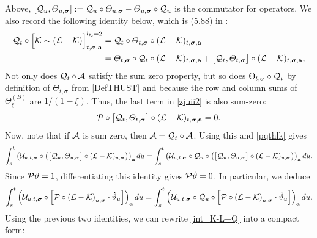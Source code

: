 Above, $[{\cal Q}_{u},\varTheta_{u,\boldsymbol{\sigma}}]:={\cal Q}_{u}\circ\varTheta_{u,\boldsymbol{\sigma}}-\varTheta_{u,\boldsymbol{\sigma}}\circ{\cal Q}_{u}$ is the commutator for operators. We also record the following identity below, which is (5.88) in \cite{YY_25}:
\begin{align}\label{zjuii2}
{\cal Q}_t \circ \Big[\mathcal{K} \sim (\mathcal{L} - \mathcal{K})\Big]^{l_\mathcal{K} = 2}_{t, \boldsymbol{\sigma}, \textbf{a}}
& = {\cal Q}_t \circ \varTheta_{t, \boldsymbol{\sigma}} \circ (\mathcal{L} - \mathcal{K})_{t, \boldsymbol{\sigma}, \textbf{a}}
\\\nonumber
& = \varTheta_{t, \boldsymbol{\sigma}} \circ {\cal Q}_t \circ (\mathcal{L} - \mathcal{K})_{t, \boldsymbol{\sigma}, \textbf{a}}
+ \big[{\cal Q}_t , \varTheta_{t, \boldsymbol{\sigma}} \big] \circ (\mathcal{L} - \mathcal{K})_{t, \boldsymbol{\sigma}, \textbf{a}},
\end{align}
Not only does ${\cal Q}_{t}\circ{\cal A}$ satisfy the sum zero property, but so does $\Theta_{t,\boldsymbol{\sigma}}\circ{\cal Q}_{t}$ by definition of $\varTheta_{t, \boldsymbol{\sigma}}$  from \eqref{DefTHUST} and because the row and column sums of $\Theta_{\xi}^{(B)}$ are $1/(1-\xi)$. Thus, the last term in \eqref{zjuii2} is also sum-zero:
\begin{align}\label{pqthlk}
   {\cal P}\circ \big[{\cal Q}_t , \varTheta_{t, \boldsymbol{\sigma}} \big] \circ (\mathcal{L} - \mathcal{K})_{t, \boldsymbol{\sigma}, \textbf{a}}=0.
\end{align}
Now, note that if ${\cal A}$ is sum zero, then ${\cal A}={\cal Q}_{t}\circ{\cal A}$. Using this and \eqref{pqthlk} gives
$$ \int_{s}^t 
     \left(\mathcal{U}_{u, t, \boldsymbol{\sigma}} 
     \circ \left( \big[{\cal Q}_u , \varTheta_{u,\boldsymbol{\sigma}} \big]\circ (\mathcal{L} - \mathcal{K}) _{u, \boldsymbol{\sigma} }\right) \right)_{\textbf{a}} du=\int_{s}^t 
     \left(\mathcal{U}_{u, t, \boldsymbol{\sigma}} 
     \circ {\cal Q}_u\circ \left( \big[{\cal Q}_u , \varTheta_{u,\boldsymbol{\sigma}} \big]\circ (\mathcal{L} - \mathcal{K}) _{u, \boldsymbol{\sigma} }\right) \right)_{\textbf{a}} du.
$$
Since ${\cal P}\vartheta=1$, differentiating this identity gives ${\cal P}\dot{\vartheta}=0$. In particular, we deduce
$$ \int_{s}^t 
     \left(\mathcal{U}_{u, t, \boldsymbol{\sigma}} 
     \circ \left[ {\cal P} \circ
      \left(\mathcal{L} - \mathcal{K}\right)_{u, \boldsymbol{\sigma}}
        \cdot \dot \vartheta_{u } \right]\right)_{\textbf{a}} du=\int_{s}^t 
     \left(\mathcal{U}_{u, t, \boldsymbol{\sigma}} 
     \circ {\cal Q}_u\circ \left[ {\cal P} \circ
      \left(\mathcal{L} - \mathcal{K}\right)_{u, \boldsymbol{\sigma}}
        \cdot \dot \vartheta_{u } \right]\right)_{\textbf{a}} du.
$$
Using the previous two identities, we can rewrite \eqref{int_K-L+Q} into a compact form:  


